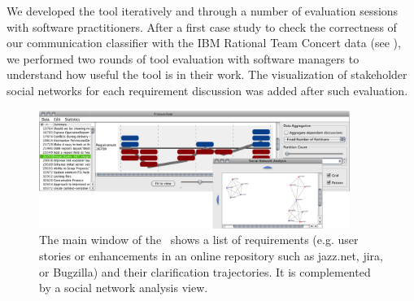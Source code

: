 We developed the tool iteratively and through a number of evaluation sessions with software practitioners. 
After a first case study to check the correctness of our communication classifier with the IBM Rational Team Concert data (see \cite{Knauss2012f}), we performed two rounds of tool evaluation with software managers to understand how useful the tool is in their work. 
The visualization of stakeholder social networks for each requirement discussion was added after such evaluation. 


\begin{figure}
\centering
\includegraphics[width=0.9\textwidth]{img/vissuelizer-screenshot2}
\caption{The main window of the \viss\ shows a list of requirements (e.g. user stories or enhancements in an online repository such as jazz.net, jira, or Bugzilla) and their clarification trajectories. It is complemented by a social network analysis view.}
\label{fig:screenshot}
\end{figure}